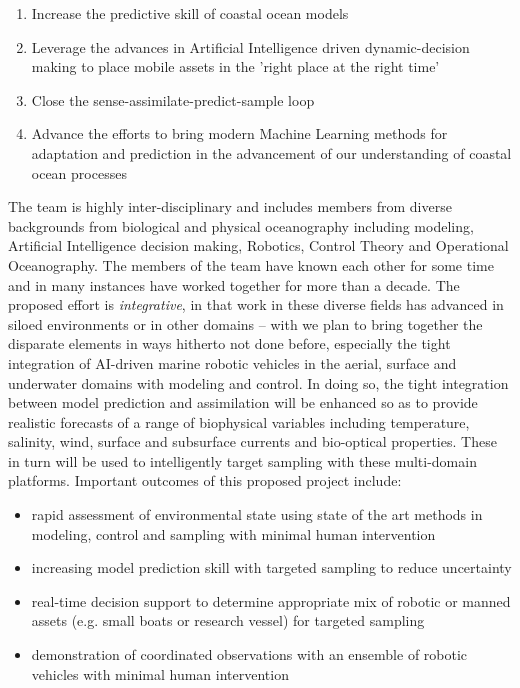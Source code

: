 \begin{enumerate}[noitemsep,topsep=0pt,parsep=0pt,partopsep=0pt]

\item Increase the predictive skill of coastal ocean models

\item Leverage the advances in Artificial Intelligence driven
  dynamic-decision making to place mobile assets in the 'right place
  at the right time'

\item Close the sense-assimilate-predict-sample loop
  
\item Advance the efforts to bring modern Machine Learning methods for
  adaptation and prediction in the advancement of our understanding of
  coastal ocean processes
  
\end{enumerate}


The \proj team is highly inter-disciplinary and includes members from
diverse backgrounds from biological and physical oceanography
including modeling, Artificial Intelligence decision making, Robotics,
Control Theory and Operational Oceanography. The members of the team
have known each other for some time and in many instances have worked
together for more than a decade.  The proposed effort is
\emph{integrative}, in that work in these diverse fields has advanced
in siloed environments or in other domains -- with \proj we plan to
bring together the disparate elements in ways hitherto not done
before, especially the tight integration of AI-driven marine robotic
vehicles in the aerial, surface and underwater domains with modeling
and control. In doing so, the tight integration between model
prediction and assimilation will be enhanced so as to provide
realistic forecasts of a range of biophysical variables including
temperature, salinity, wind, surface and subsurface currents and
bio-optical properties. These in turn will be used to intelligently
target sampling with these multi-domain platforms. Important outcomes
of this proposed project include:

\begin{itemize}[noitemsep,topsep=0pt,parsep=0pt,partopsep=0pt]

\item rapid assessment of environmental state using state of the art
  methods in modeling, control and sampling with minimal human
  intervention
  
\item increasing model prediction skill with targeted sampling to reduce
  uncertainty
  
\item real-time decision support to determine appropriate mix of robotic
  or manned assets (e.g. small boats or research vessel) for targeted
  sampling
  
\item demonstration of coordinated observations with an ensemble of
  robotic vehicles with minimal human intervention

\end{itemize}  

